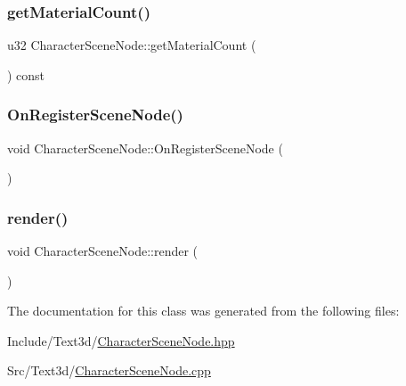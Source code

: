 \mbox{\label{class_character_scene_node_ae5ad83850c7cca8aed2660267dc09351}} 
\subsubsection{\texorpdfstring{getMaterialCount()}{getMaterialCount()}}
{\footnotesize\ttfamily u32 Character\+Scene\+Node\+::get\+Material\+Count (\begin{DoxyParamCaption}{ }\end{DoxyParamCaption}) const}

\mbox{\label{class_character_scene_node_a6ff117bfc208a8e078dad6b9ec67dc1b}} 
\subsubsection{\texorpdfstring{OnRegisterSceneNode()}{OnRegisterSceneNode()}}
{\footnotesize\ttfamily void Character\+Scene\+Node\+::\+On\+Register\+Scene\+Node (\begin{DoxyParamCaption}{ }\end{DoxyParamCaption})}

\mbox{\label{class_character_scene_node_aa162da6bb2fe0640209d143f876454f7}} 
\subsubsection{\texorpdfstring{render()}{render()}}
{\footnotesize\ttfamily void Character\+Scene\+Node\+::render (\begin{DoxyParamCaption}{ }\end{DoxyParamCaption})}



The documentation for this class was generated from the following files\+:\begin{DoxyCompactItemize}
\item 
Include/\+Text3d/\mbox{\hyperlink{_character_scene_node_8hpp}{Character\+Scene\+Node.\+hpp}}\item 
Src/\+Text3d/\mbox{\hyperlink{_character_scene_node_8cpp}{Character\+Scene\+Node.\+cpp}}\end{DoxyCompactItemize}
